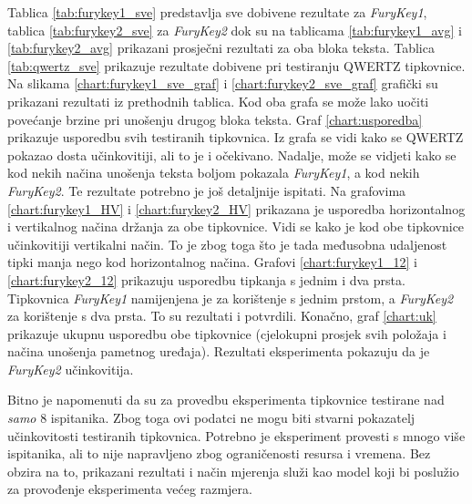 \documentclass[times, utf8, zavrsni, numeric]{fer}
\begin{document}
Tablica \ref{tab:furykey1_sve} predstavlja sve dobivene rezultate za \emph{FuryKey1}, tablica \ref{tab:furykey2_sve} za \emph{FuryKey2} dok su na tablicama \ref{tab:furykey1_avg} i \ref{tab:furykey2_avg} prikazani prosječni rezultati za oba bloka teksta. Tablica \ref{tab:qwertz_sve} prikazuje rezultate dobivene pri testiranju QWERTZ tipkovnice.
Na slikama \ref{chart:furykey1_sve_graf} i \ref{chart:furykey2_sve_graf} grafički su prikazani rezultati iz prethodnih tablica. Kod oba grafa se može lako uočiti povećanje brzine pri unošenju drugog bloka teksta. Graf \ref{chart:usporedba} prikazuje usporedbu svih testiranih tipkovnica. Iz grafa se vidi kako se QWERTZ pokazao dosta učinkovitiji, ali to je i očekivano. Nadalje, može se vidjeti kako se kod nekih načina unošenja teksta boljom pokazala \emph{FuryKey1}, a kod nekih \emph{FuryKey2}. Te rezultate potrebno je još detaljnije ispitati. Na grafovima \ref{chart:furykey1_HV} i \ref{chart:furykey2_HV} prikazana je usporedba horizontalnog i vertikalnog načina držanja za obe tipkovnice. Vidi se kako je kod obe tipkovnice učinkovitiji vertikalni način. To je zbog toga što je tada međusobna udaljenost tipki manja nego kod horizontalnog načina. Grafovi \ref{chart:furykey1_12} i \ref{chart:furykey2_12} prikazuju usporedbu tipkanja s jednim i dva prsta. Tipkovnica \emph{FuryKey1} namijenjena je za korištenje s jednim prstom, a \emph{FuryKey2} za korištenje s dva prsta. To su rezultati i potvrdili. Konačno, graf \ref{chart:uk} prikazuje ukupnu usporedbu obe tipkovnice (cjelokupni prosjek svih položaja i načina unošenja pametnog uređaja). Rezultati eksperimenta pokazuju da je \emph{FuryKey2} učinkovitija.

Bitno je napomenuti da su za provedbu eksperimenta tipkovnice testirane nad \emph{samo} 8 ispitanika. Zbog toga ovi podatci ne mogu biti stvarni pokazatelj učinkovitosti testiranih tipkovnica. Potrebno je eksperiment provesti s mnogo više ispitanika, ali to nije napravljeno zbog ograničenosti resursa i vremena. Bez obzira na to, prikazani rezultati i način mjerenja služi kao model koji bi poslužio za provođenje eksperimenta većeg razmjera.
\end{document}

